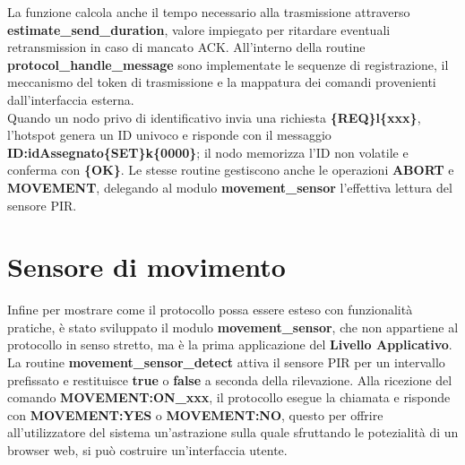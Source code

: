 La funzione calcola anche il tempo necessario alla trasmissione attraverso \textbf{estimate\_send\_duration},
 valore impiegato per ritardare eventuali retransmission in caso di mancato ACK. All’interno della routine \textbf{protocol\_handle\_message} 
 sono implementate le sequenze di registrazione, il meccanismo del token di trasmissione e la mappatura dei comandi provenienti dall’interfaccia esterna.\\
  Quando un nodo privo di identificativo invia una richiesta \textbf{\{REQ\}l\{xxx\}}, l’hotspot genera un ID univoco e risponde con il messaggio 
  \textbf{ID:idAssegnato\{SET\}k\{0000\}}; il nodo memorizza l’ID non volatile e conferma con \textbf{\{OK\}}. Le stesse routine gestiscono anche 
  le operazioni \textbf{ABORT} e \textbf{MOVEMENT}, delegando al modulo \textbf{movement\_sensor} l’effettiva lettura del sensore PIR.

  \section{Sensore di movimento}

  Infine per mostrare come il protocollo possa essere esteso con funzionalità pratiche, è stato sviluppato il modulo \textbf{movement\_sensor}, che non appartiene al
  protocollo in senso stretto, ma è la prima applicazione del \textbf{Livello Applicativo}. 
  La routine \textbf{movement\_sensor\_detect} attiva il sensore PIR per un intervallo prefissato e restituisce \textbf{true} o \textbf{false} 
  a seconda della rilevazione. Alla ricezione del comando \textbf{MOVEMENT:ON\_xxx}, il protocollo esegue la chiamata e risponde con \textbf{MOVEMENT:YES} 
  o \textbf{MOVEMENT:NO}, questo per offrire all'utilizzatore del sistema un'astrazione sulla quale sfruttando le potezialità di
  un browser web, si può costruire un'interfaccia utente.